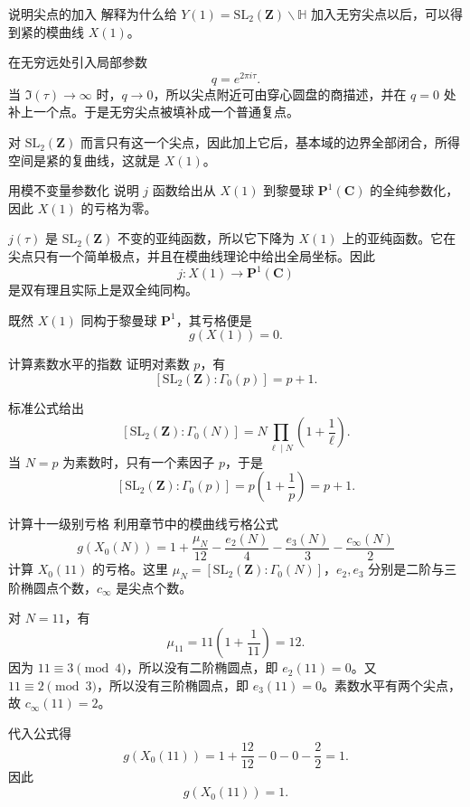 \begin{problem}{说明尖点的加入}
\easy
解释为什么给 $Y(1)=\mathrm{SL}_2(\mathbf Z)\backslash\mathbb H$ 加入无穷尖点以后，可以得到紧的模曲线 $X(1)$。
\end{problem}
\begin{solution}
在无穷远处引入局部参数
\[
q=e^{2\pi i\tau}.
\]
当 $\Im(\tau)\to\infty$ 时，$q\to0$，所以尖点附近可由穿心圆盘的商描述，并在 $q=0$ 处补上一个点。于是无穷尖点被填补成一个普通复点。

对 $\mathrm{SL}_2(\mathbf Z)$ 而言只有这一个尖点，因此加上它后，基本域的边界全部闭合，所得空间是紧的复曲线，这就是 $X(1)$。
\end{solution}

\begin{problem}{用模不变量参数化}
\easy
说明 $j$ 函数给出从 $X(1)$ 到黎曼球 $\mathbf P^1(\mathbf C)$ 的全纯参数化，因此 $X(1)$ 的亏格为零。
\end{problem}
\begin{solution}
$j(\tau)$ 是 $\mathrm{SL}_2(\mathbf Z)$ 不变的亚纯函数，所以它下降为 $X(1)$ 上的亚纯函数。它在尖点只有一个简单极点，并且在模曲线理论中给出全局坐标。因此
\[
j:X(1)\longrightarrow \mathbf P^1(\mathbf C)
\]
是双有理且实际上是双全纯同构。

既然 $X(1)$ 同构于黎曼球 $\mathbf P^1$，其亏格便是
\[
g(X(1))=0.
\]
\end{solution}

\begin{problem}{计算素数水平的指数}
\easy
证明对素数 $p$，有
\[
[\mathrm{SL}_2(\mathbf Z):\Gamma_0(p)]=p+1.
\]
\end{problem}
\begin{solution}
标准公式给出
\[
[\mathrm{SL}_2(\mathbf Z):\Gamma_0(N)]=N\prod_{\ell\mid N}\left(1+\frac1\ell\right).
\]
当 $N=p$ 为素数时，只有一个素因子 $p$，于是
\[
[\mathrm{SL}_2(\mathbf Z):\Gamma_0(p)]=p\left(1+\frac1p\right)=p+1.
\]
\end{solution}

\begin{problem}{计算十一级别亏格}
\easy
利用章节中的模曲线亏格公式
\[
g(X_0(N))=1+\frac{\mu_N}{12}-\frac{e_2(N)}{4}-\frac{e_3(N)}{3}-\frac{c_\infty(N)}{2}
\]
计算 $X_0(11)$ 的亏格。这里 $\mu_N=[\mathrm{SL}_2(\mathbf Z):\Gamma_0(N)]$，$e_2,e_3$ 分别是二阶与三阶椭圆点个数，$c_\infty$ 是尖点个数。
\end{problem}
\begin{solution}
对 $N=11$，有
\[
\mu_{11}=11\left(1+\frac1{11}\right)=12.
\]
因为 $11\equiv3\pmod4$，所以没有二阶椭圆点，即 $e_2(11)=0$。又 $11\equiv2\pmod3$，所以没有三阶椭圆点，即 $e_3(11)=0$。素数水平有两个尖点，故 $c_\infty(11)=2$。

代入公式得
\[
g(X_0(11))=1+\frac{12}{12}-0-0-\frac22=1.
\]
因此
\[
g(X_0(11))=1.
\]
\end{solution}

